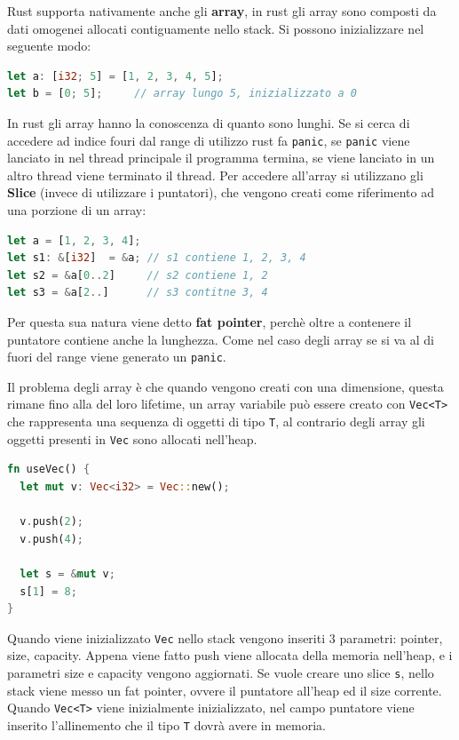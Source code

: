 \documentclass[12pt]{article}
\begin{document}
Rust supporta nativamente anche gli \textbf{array}, in rust gli array sono composti da dati omogenei allocati contiguamente nello stack. Si possono inizializzare nel seguente modo:
\begin{lstlisting}[language=rust]
let a: [i32; 5] = [1, 2, 3, 4, 5];
let b = [0; 5];     // array lungo 5, inizializzato a 0
\end{lstlisting}
In rust gli array hanno la conoscenza di quanto sono lunghi. Se si cerca di accedere ad indice fouri dal range di utilizzo rust fa \texttt{panic}, se \texttt{panic} viene lanciato in nel thread principale il programma termina, se viene lanciato in un altro thread viene terminato il thread. Per accedere all'array si utilizzano gli \textbf{Slice} (invece di utilizzare i puntatori), che vengono creati come riferimento ad una porzione di un array:
\begin{lstlisting}[language=rust]
let a = [1, 2, 3, 4];
let s1: &[i32]  = &a; // s1 contiene 1, 2, 3, 4
let s2 = &a[0..2]     // s2 contiene 1, 2
let s3 = &a[2..]      // s3 contitne 3, 4
\end{lstlisting}
Per questa sua natura viene detto \textbf{fat pointer}, perch\`e oltre a contenere il puntatore contiene anche la lunghezza. Come nel caso degli array se si va al di fuori del range viene generato un \texttt{panic}.

Il problema degli array \`e che quando vengono creati con una dimensione, questa rimane fino alla del loro lifetime, un array variabile pu\`o essere creato con \texttt{Vec<T>} che rappresenta una sequenza di oggetti di tipo \texttt{T}, al contrario degli array gli oggetti presenti in \texttt{Vec} sono allocati nell'heap.
\begin{lstlisting}[language=rust]
fn useVec() {
  let mut v: Vec<i32> = Vec::new();

  v.push(2);
  v.push(4);

  let s = &mut v;
  s[1] = 8;
}
\end{lstlisting}
Quando viene inizializzato \texttt{Vec} nello stack vengono inseriti 3 parametri: pointer, size, capacity. Appena viene fatto push viene allocata della memoria nell'heap, e i parametri size e capacity vengono aggiornati. Se vuole creare uno slice \texttt{s}, nello stack viene messo un fat pointer, ovvere il puntatore all'heap ed il size corrente. Quando \texttt{Vec<T>} viene inizialmente inizializzato, nel campo puntatore viene inserito l'allinemento che il tipo \texttt{T} dovr\`a avere in memoria.
\end{document}

